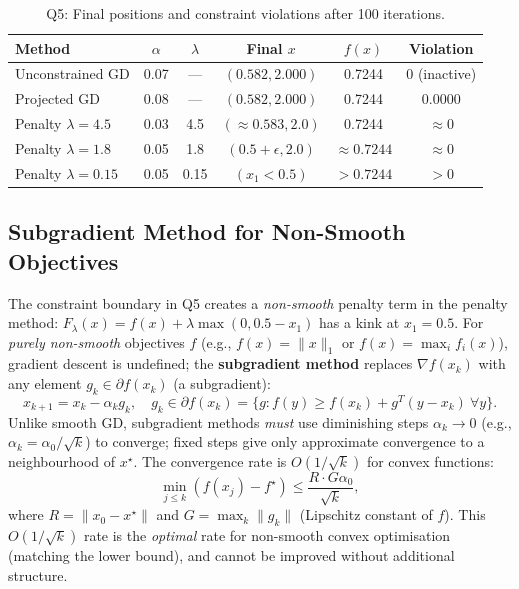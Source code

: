 \documentclass[11pt,a4paper]{article}
\theoremstyle{definition}
\begin{document}
\begin{table}[H]
\centering
\caption{Q5: Final positions and constraint violations after 100 iterations.}
\label{tab:q5_final}
\begin{tabular}{lccccc}
\toprule
\textbf{Method} & \textbf{$\alpha$} & \textbf{$\lambda$} & \textbf{Final $x$} & \textbf{$f(x)$} & \textbf{Violation} \\
\midrule
Unconstrained GD & 0.07 & --- & $(0.582, 2.000)$ & 0.7244 & $0$ (inactive) \\
Projected GD & 0.08 & --- & $(0.582, 2.000)$ & 0.7244 & $0.0000$ \\
Penalty $\lambda = 4.5$ & 0.03 & 4.5 & $(\approx 0.583, 2.0)$ & 0.7244 & $\approx 0$ \\
Penalty $\lambda = 1.8$ & 0.05 & 1.8 & $(0.5+\epsilon, 2.0)$ & $\approx 0.7244$ & $\approx 0$ \\
Penalty $\lambda = 0.15$ & 0.05 & 0.15 & $(x_1 < 0.5)$ & $> 0.7244$ & $> 0$ \\
\bottomrule
\end{tabular}
\end{table}

\subsection{Subgradient Method for Non-Smooth Objectives}

The constraint boundary in Q5 creates a \emph{non-smooth} penalty term in the penalty method: $F_\lambda(x) = f(x) + \lambda \max(0, 0.5-x_1)$ has a kink at $x_1 = 0.5$. For \emph{purely non-smooth} objectives $f$ (e.g., $f(x) = \|x\|_1$ or $f(x) = \max_i f_i(x)$), gradient descent is undefined; the \textbf{subgradient method} replaces $\nabla f(x_k)$ with any element $g_k \in \partial f(x_k)$ (a subgradient):
\begin{equation}
x_{k+1} = x_k - \alpha_k g_k, \quad g_k \in \partial f(x_k) = \{g : f(y) \geq f(x_k) + g^T(y-x_k)\ \forall y\}.
\end{equation}
Unlike smooth GD, subgradient methods \emph{must} use diminishing steps $\alpha_k \to 0$ (e.g., $\alpha_k = \alpha_0/\sqrt{k}$) to converge; fixed steps give only approximate convergence to a neighbourhood of $x^{\star}$. The convergence rate is $O(1/\sqrt{k})$ for convex functions:
\begin{equation}
\min_{j \leq k}(f(x_j) - f^{\star}) \leq \frac{R \cdot G \alpha_0}{\sqrt{k}},
\label{eq:subgrad_rate}
\end{equation}
where $R = \|x_0 - x^{\star}\|$ and $G = \max_k \|g_k\|$ (Lipschitz constant of $f$). This $O(1/\sqrt{k})$ rate is the \emph{optimal} rate for non-smooth convex optimisation (matching the lower bound), and cannot be improved without additional structure.
\end{document}
